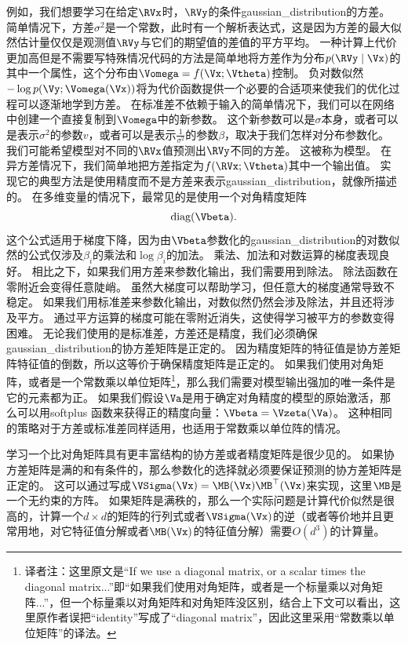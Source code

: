 例如，我们想要学习在给定$\RVx$时，$\RVy$的条件\gls{gaussian_distribution}的方差。
简单情况下，方差$\sigma^2$是一个常数，此时有一个解析表达式，这是因为方差的最大似然估计量仅仅是观测值$\RVy$与它们的期望值的差值的平方平均。
一种计算上代价更加高但是不需要写特殊情况代码的方法是简单地将方差作为分布$p(\RVy\mid\Vx)$的其中一个属性，这个分布由$\Vomega=f(\Vx;\Vtheta)$控制。
负对数似然$-\log p(\Vy;\Vomega(\Vx))$将为代价函数提供一个必要的合适项来使我们的优化过程可以逐渐地学到方差。
在标准差不依赖于输入的简单情况下，我们可以在网络中创建一个直接复制到$\Vomega$中的新参数。
这个新参数可以是$\sigma$本身，或者可以是表示$\sigma^2$的参数$v$，或者可以是表示$\frac{1}{\sigma^2}$的参数$\beta$，取决于我们怎样对分布参数化。
我们可能希望模型对不同的$\RVx$值预测出$\RVy$不同的方差。
这被称为模型。
在异方差情况下，我们简单地把方差指定为$f(\RVx;\Vtheta)$其中一个输出值。
实现它的典型方法是使用精度而不是方差来表示\gls{gaussian_distribution}，就像所描述的。
在多维变量的情况下，最常见的是使用一个对角精度矩阵
\begin{equation}
\text{diag}(\Vbeta).
\end{equation}
这个公式适用于梯度下降，因为由$\Vbeta$参数化的\gls{gaussian_distribution}的对数似然的公式仅涉及$\beta_i$的乘法和$\log \beta_i$的加法。
乘法、加法和对数运算的梯度表现良好。
相比之下，如果我们用方差来参数化输出，我们需要用到除法。
除法函数在零附近会变得任意陡峭。
虽然大梯度可以帮助学习，但任意大的梯度通常导致不稳定。
如果我们用标准差来参数化输出，对数似然仍然会涉及除法，并且还将涉及平方。
通过平方运算的梯度可能在零附近消失，这使得学习被平方的参数变得困难。
无论我们使用的是标准差，方差还是精度，我们必须确保\gls{gaussian_distribution}的协方差矩阵是正定的。
因为精度矩阵的特征值是协方差矩阵特征值的倒数，所以这等价于确保精度矩阵是正定的。
如果我们使用对角矩阵，或者是一个常数乘以单位矩阵\footnote{译者注：这里原文是``If we use a diagonal matrix, or a scalar times the diagonal matrix...''即``如果我们使用对角矩阵，或者是一个标量乘以对角矩阵...''，但一个标量乘以对角矩阵和对角矩阵没区别，结合上下文可以看出，这里原作者误把``identity''写成了``diagonal matrix''，因此这里采用``常数乘以单位矩阵''的译法。}，那么我们需要对模型输出强加的唯一条件是它的元素都为正。
如果我们假设$\Va$是用于确定对角精度的模型的原始激活，那么可以用softplus 函数来获得正的精度向量：$\Vbeta=\Vzeta(\Va)$。
这种相同的策略对于方差或标准差同样适用，也适用于常数乘以单位阵的情况。


学习一个比对角矩阵具有更丰富结构的协方差或者精度矩阵是很少见的。
如果协方差矩阵是满的和有条件的，那么参数化的选择就必须要保证预测的协方差矩阵是正定的。
这可以通过写成$\VSigma(\Vx)=\MB(\Vx)\MB^\top (\Vx)$来实现，这里$\MB$是一个无约束的方阵。
如果矩阵是满秩的，那么一个实际问题是计算代价似然是很高的，计算一个$d\times d$的矩阵的行列式或者$\VSigma(\Vx)$的逆（或者等价地并且更常用地，对它特征值分解或者$\MB(\Vx)$的特征值分解）需要$O(d^3)$的计算量。

